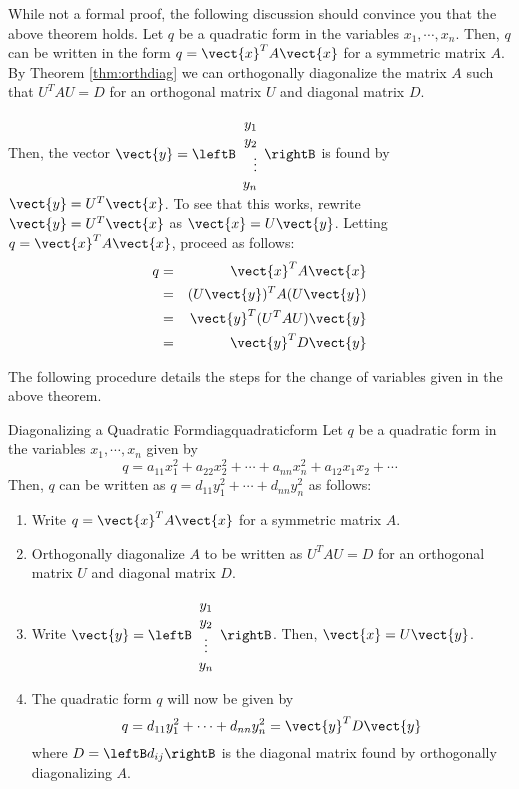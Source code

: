 While not a formal proof, the following discussion should convince you that the above theorem holds. Let $q$ be a quadratic form in the variables $x_1, \cdots, x_n$. Then, $q$ can be written in the form $q = \vect{x}^T A \vect{x}$ for a symmetric matrix $A$.  
By Theorem \ref{thm:orthdiag} we can orthogonally diagonalize the matrix $A$ such that $U^TAU = D$ for an orthogonal matrix $U$ and diagonal matrix $D$. 

Then, the vector $\vect{y} = \leftB \begin{array}{r}
y_1 \\
y_2 \\
\vdots \\
y_n
\end{array}
\rightB
$ is found by $\vect{y} = U^T \vect{x}$. To see that this works, rewrite $\vect{y} = U^T \vect{x}$ as $\vect{x} = U\vect{y}$. Letting $q = \vect{x}^TA\vect{x}$, proceed as follows:
\begin{eqnarray*}
q &=& \vect{x}^T A \vect{x}\\
&=& (U\vect{y})^T A (U\vect{y})\\
&=& \vect{y}^T (U^TAU) \vect{y} \\
&=& \vect{y}^T D \vect{y}
\end{eqnarray*}

The following procedure details the steps for the change of variables given in the above theorem. 

\begin{procedure}{Diagonalizing a Quadratic Form}{diagquadraticform}
Let $q$ be a quadratic form in the variables $x_1, \cdots, x_n$ given by 
\[
q = a_{11}x_1^2 + a_{22}x_2^2 + \cdots + a_{nn}x_n^2 + a_{12}x_1x_2+\cdots
\]
Then, $q$ can be written as $q = d_{11}y_1^2 + \cdots + d_{nn}y_n^2$ as follows:

\begin{enumerate}
\item
Write $q = \vect{x}^T A \vect{x}$ for a symmetric matrix $A$. 

\item
Orthogonally diagonalize $A$ to be written as $U^TAU=D$ for an orthogonal matrix $U$ and diagonal matrix $D$. 

\item
Write $\vect{y} = \leftB \begin{array}{c}
y_1 \\
y_2 \\
\vdots \\
y_n
\end{array}
\rightB$. Then, $\vect{x} = U \vect{y}$. 

\item 
The quadratic form $q$ will now be given by 
\[
q = d_{11}y_1^2 + \cdots + d_{nn}y_n^2 = \vect{y}^T D \vect{y}
\]
where $D = \leftB d_{ij} \rightB$ is the diagonal matrix found by orthogonally diagonalizing $A$. 
\end{enumerate}
\end{procedure}

